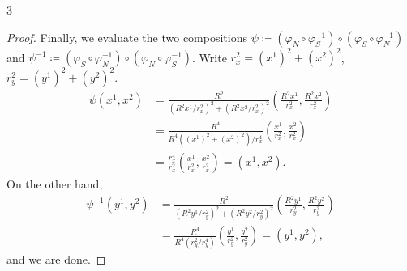 \documentclass[11pt]{article}
\begin{document}
\begin{problem}{3}
\begin{enumerate}[label=(\alph*)]
\begin{proof}
            Finally, we evaluate the two compositions \( \psi \coloneq (\varphi_N \circ \varphi_S^{-1}) \circ (\varphi_S \circ \varphi_N^{-1})\) and \( \psi^{-1} \coloneq (\varphi_S \circ \varphi_N^{-1}) \circ (\varphi_N \circ \varphi_S^{-1}) \).
            Write \( r_x^2 = (x^1)^2 + (x^2)^2 \), \( r_y^2 = (y^1)^2 + (y^2)^2 \).
            \begin{equation}
            \label{eq:41}
            \begin{aligned}
              \psi(x^1, x^2) &= \frac{R^2}{(R^2 x^1/r_x^2)^2 + (R^2 x^2/r_{x}^2)^2 }\left( \frac{R^2 x^{1}}{r_{x}^2}, \frac{R^2 x^2}{r_x^2} \right) \\
                          &= \frac{R^{4}}{R^4((x^1)^2 + (x^2)^2)/r_x^4} \left( \frac{x^{1}}{r_{x}^2}, \frac{x^2}{r_{x}^2} \right) \\
              &= \frac{r_{x}^4}{r_x^2} \left( \frac{x^1}{r_{x}^2}, \frac{x^2}{r_x^2} \right) = (x^1, x^2).
            \end{aligned}
          \end{equation}
          On the other hand,
          \begin{equation}
          \label{eq:42}
          \begin{aligned}
            \psi^{-1}(y^1, y^2) &= \frac{R^2}{(R^2y^{1}/r_y^2)^2 + (R^2y^2/r_y^2)^2} \left( \frac{R^2 y^{1}}{r_{y}^2}, \frac{R^2 y^2}{r_{y}^2} \right) \\
            &= \frac{R^{4}}{R^{4}(r_y^2/r_y^4)} \left( \frac{y^1}{r_y^2}, \frac{y^2}{r_{y}^2} \right) = (y^1, y^2),
          \end{aligned}
        \end{equation}
        and we are done.
          \end{proof}
	\end{enumerate}
\end{problem}
\end{document}
